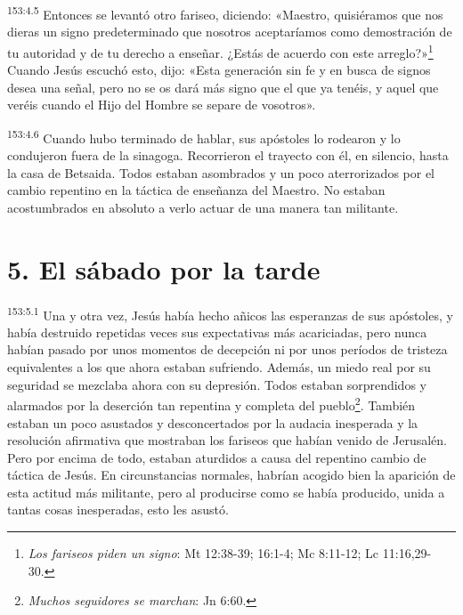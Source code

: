 \par
\textsuperscript{153:4.5} Entonces se levantó otro fariseo, diciendo: «Maestro, quisiéramos que nos dieras un signo predeterminado que nosotros aceptaríamos como demostración de tu autoridad y de tu derecho a enseñar. ¿Estás de acuerdo con este arreglo?»\footnote{\textit{Los fariseos piden un signo}: Mt 12:38-39; 16:1-4; Mc 8:11-12; Lc 11:16,29-30.} Cuando Jesús escuchó esto, dijo: «Esta generación sin fe y en busca de signos desea una señal, pero no se os dará más signo que el que ya tenéis, y aquel que veréis cuando el Hijo del Hombre se separe de vosotros».

\par
\textsuperscript{153:4.6} Cuando hubo terminado de hablar, sus apóstoles lo rodearon y lo condujeron fuera de la sinagoga. Recorrieron el trayecto con él, en silencio, hasta la casa de Betsaida. Todos estaban asombrados y un poco aterrorizados por el cambio repentino en la táctica de enseñanza del Maestro. No estaban acostumbrados en absoluto a verlo actuar de una manera tan militante.

\section*{5. El sábado por la tarde}
\par
\textsuperscript{153:5.1} Una y otra vez, Jesús había hecho añicos las esperanzas de sus apóstoles, y había destruido repetidas veces sus expectativas más acariciadas, pero nunca habían pasado por unos momentos de decepción ni por unos períodos de tristeza equivalentes a los que ahora estaban sufriendo. Además, un miedo real por su seguridad se mezclaba ahora con su depresión. Todos estaban sorprendidos y alarmados por la deserción tan repentina y completa del pueblo\footnote{\textit{Muchos seguidores se marchan}: Jn 6:60.}. También estaban un poco asustados y desconcertados por la audacia inesperada y la resolución afirmativa que mostraban los fariseos que habían venido de Jerusalén. Pero por encima de todo, estaban aturdidos a causa del repentino cambio de táctica de Jesús. En circunstancias normales, habrían acogido bien la aparición de esta actitud más militante, pero al producirse como se había producido, unida a tantas cosas inesperadas, esto les asustó.

